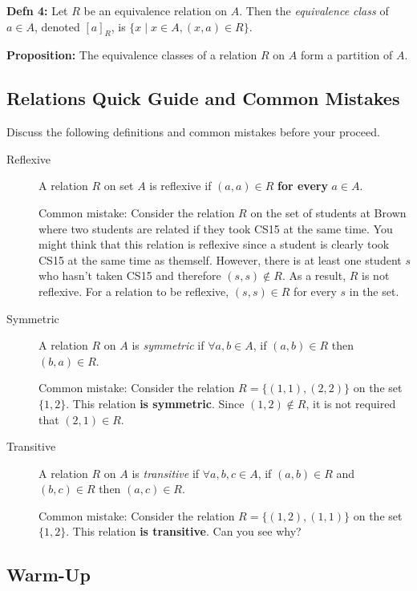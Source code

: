 \documentclass[12pt,letterpaper]{article}
\newcommand\proposition{\textbf{Proposition: }}
\begin{document}
\textbf{Defn 4:} Let $R$ be an equivalence relation on $A$. Then the \textit{equivalence class} of $a \in A$, denoted $\left[a\right]_R$, is $\{x \mid x\in A, (x,a) \in R\}$.

\proposition The equivalence classes of a relation $R$ on $A$ form a partition of $A$.
	
	\subsection*{Relations Quick Guide and Common Mistakes}
	
	Discuss the following definitions and common mistakes before your proceed.
	
	\begin{description}
		\item[Reflexive]{A relation $R$ on set $A$ is reflexive if $(a,a)\in R$ \textbf{for every} $a \in A$. 

Common mistake: Consider the relation $R$ on the set of students at Brown where two students are related if they took CS15 at the same time. You might think that this relation is reflexive since a student is clearly took CS15 at the same time as themself. However, there is at least one student $s$ who hasn't taken CS15 and therefore $(s,s) \not\in R$. As a result, $R$ is not reflexive. For a relation to be reflexive, $(s,s) \in R$ for every $s$ in the set.}
	
	  \item[Symmetric]{A relation $R$ on $A$ is \textit{symmetric} if $\forall a,b \in A$, if $(a,b) \in R$ then $(b,a) \in R$.

		Common mistake: Consider the relation $R = \{(1,1),(2,2)\}$ on the set $\{1,2\}$. This relation \textbf{is symmetric}. Since $(1,2) \not\in R$, it is not required that $(2,1) \in R$.}

	\item[Transitive]{A relation $R$ on $A$ is \textit{transitive} if $\forall a,b,c \in A$, if $(a,b) \in R$ and $(b,c) \in R$ then $(a,c) \in R$. 

	Common mistake: Consider the relation $R = \{(1,2),(1,1)\}$ on the set $\{1,2\}$. This relation \textbf{is transitive}. Can you see why?}

	\end{description}

	\subsection*{Warm-Up}
	
\end{document}
